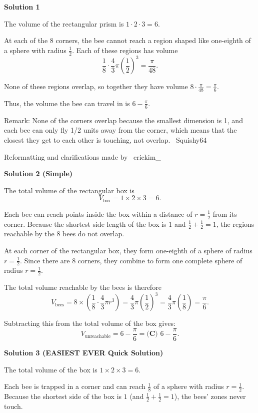 \begin{enumerate}
\textbf{Solution 1}

The volume of the rectangular prism is $1 \cdot 2 \cdot 3 = 6$.

 At each of the $8$ corners, the bee cannot reach a region shaped like one-eighth of a sphere with radius $\frac{1}{2}$. Each of these regions has volume
 \[\frac{1}{8} \cdot \frac{4}{3}\pi\left(\frac{1}{2}\right)^3 = \frac{\pi}{48}.\]

 None of these regions overlap, so together they have volume $8 \cdot \frac{\pi}{48} = \frac{\pi}{6}$.

 Thus, the volume the bee can travel in is $\boxed{6 - \frac{\pi}{6}}$.

 Remark: None of the corners overlap because the smallest dimension is 1, and each bee can only fly 1/2 units away from the corner, which means that the closest they get to each other is touching, not overlap. ~Squishy64

 Reformatting and clarifications made by ~erickim\_

 



\textbf{Solution 2 (Simple)}

The total volume of the rectangular box is
 \[V_{\text{box}} = 1 \times 2 \times 3 = 6.\]

 Each bee can reach points inside the box within a distance of $r = \frac{1}{2}$ from its corner. Because the shortest side length of the box is $1$ and $\frac{1}{2} + \frac{1}{2} = 1$, the regions reachable by the $8$ bees do not overlap.

 At each corner of the rectangular box, they form one-eighth of a sphere of radius $r = \frac{1}{2}$. Since there are $8$ corners, they combine to form one complete sphere of radius $r = \frac{1}{2}$.

 The total volume reachable by the bees is therefore
 \[V_{\text{bees}} = 8 \times \left(\frac{1}{8} \cdot \frac{4}{3}\pi r^3\right) = \frac{4}{3}\pi \left(\frac{1}{2}\right)^3 = \frac{4}{3}\pi \left(\frac{1}{8}\right) = \frac{\pi}{6}.\]

 Subtracting this from the total volume of the box gives:
 \[V_{\text{unreachable}} = 6 - \frac{\pi}{6} = \boxed{\textbf{(C) } 6 - \frac{\pi}{6}}.\]




\textbf{Solution 3 (EASIEST EVER Quick Solution)}

The total volume of the box is $1 \times 2 \times 3 = 6$.

 Each bee is trapped in a corner and can reach $\frac{1}{8}$ of a sphere with radius $r = \frac{1}{2}$. Because the shortest side of the box is $1$ (and $\frac{1}{2} + \frac{1}{2} = 1$), the bees' zones never touch. 


\end{enumerate}
